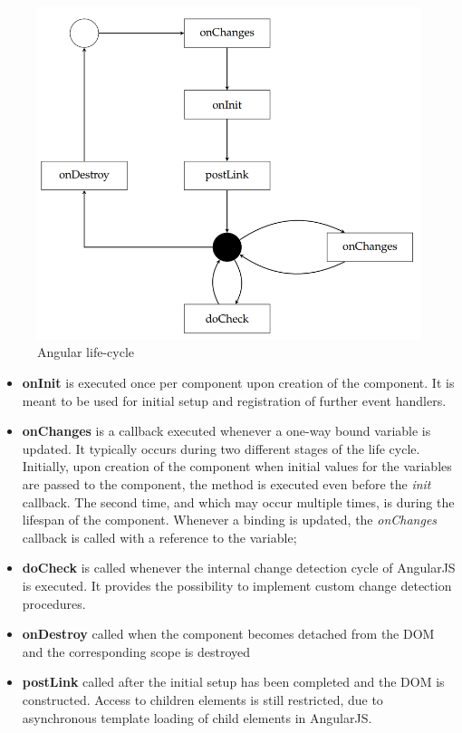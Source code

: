 \begin{figure}[H]
	\centering
	\includegraphics[width=0.75\linewidth]{Chapters/img/frontend/angular-lifecycle.png}
	\caption{Angular life-cycle \cite{react-lifecycle}}
	\label{fig:angular-lifecycle}
\end{figure}

\begin{itemize}
    \item \textbf{onInit} is executed once per component upon creation of the component. It is meant to be used for initial setup and registration of further event handlers.
    \item \textbf{onChanges} is a callback executed whenever a one-way bound variable is updated. It typically occurs during two different stages of the life cycle. Initially, upon creation of the component when initial values for the variables are passed to the component, the method is executed even before the \textit{init} callback. The second time, and which may occur multiple times, is during the lifespan of the component. Whenever a binding is updated, the \textit{onChanges} callback is called with a reference to the variable;
    \item \textbf{doCheck} is called whenever the internal change detection cycle of AngularJS is executed. It provides the possibility to implement custom change detection procedures.
    \item \textbf{onDestroy} called when the component becomes detached from the DOM and the corresponding scope is destroyed
    \item \textbf{postLink} called after the initial setup has been completed and the DOM is constructed. Access to children elements is still restricted, due to asynchronous template loading of child elements in AngularJS.
\end{itemize}

